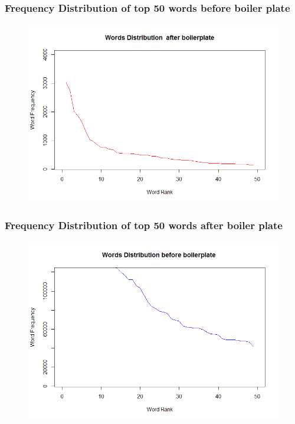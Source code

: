 \documentclass[12pt]{Report}
\begin{document}
\subsubsection{ Frequency Distribution of top 50 words before boiler plate}
\begin{figure}[ht]    
    \begin{center}
        \includegraphics[scale=0.60]{afterboilerplate.png}
        \caption{}
        \label{}
    \end{center}
\end{figure}

\newpage
\subsubsection{ Frequency Distribution of top 50 words after boiler plate}
\begin{figure}[ht]    
    \begin{center}
        \includegraphics[scale=0.60]{beforeboilerplate.png}
        \caption{}
        \label{}
    \end{center}
\end{figure}
 
\end{document}
